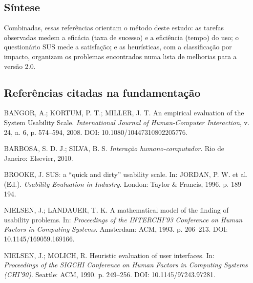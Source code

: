 \documentclass[a4paper,12pt]{article}
\begin{document}
\subsection*{Síntese}

Combinadas, essas referências orientam o método deste estudo: as tarefas
observadas medem a eficácia (taxa de sucesso) e a eficiência (tempo) do
uso; o questionário SUS mede a satisfação; e as heurísticas, com a
classificação por impacto, organizam os problemas encontrados numa
lista de melhorias para a versão 2.0.

\subsection*{Referências citadas na fundamentação}

{\small
BANGOR, A.; KORTUM, P. T.; MILLER, J. T. An empirical evaluation of the System Usability Scale. \emph{International Journal of Human-Computer Interaction}, v. 24, n. 6, p. 574--594, 2008. DOI: 10.1080/10447310802205776.

BARBOSA, S. D. J.; SILVA, B. S. \emph{Interação humano-computador}. Rio de Janeiro: Elsevier, 2010.

BROOKE, J. SUS: a ``quick and dirty'' usability scale. In: JORDAN, P. W. et al. (Ed.). \emph{Usability Evaluation in Industry}. London: Taylor \& Francis, 1996. p. 189--194.

NIELSEN, J.; LANDAUER, T. K. A mathematical model of the finding of usability problems. In: \emph{Proceedings of the INTERCHI'93 Conference on Human Factors in Computing Systems}. Amsterdam: ACM, 1993. p. 206--213. DOI: 10.1145/169059.169166.

NIELSEN, J.; MOLICH, R. Heuristic evaluation of user interfaces. In: \emph{Proceedings of the SIGCHI Conference on Human Factors in Computing Systems (CHI'90)}. Seattle: ACM, 1990. p. 249--256. DOI: 10.1145/97243.97281.
}
\end{document}
